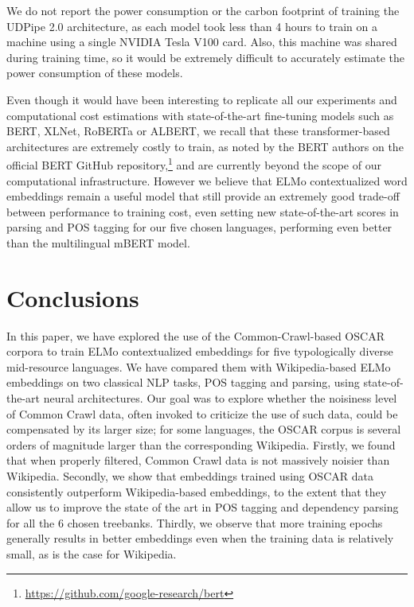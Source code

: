 We do not report the power consumption or the carbon footprint of training the UDPipe 2.0 architecture, as each model took less than 4 hours to train on a machine using a single NVIDIA Tesla V100 card. Also, this machine was shared during training time, so it would be extremely difficult to accurately estimate the power consumption of these models.

Even though it would have been interesting to replicate all our experiments and computational cost estimations with state-of-the-art fine-tuning models such as BERT, XLNet, RoBERTa or ALBERT, we recall that these transformer-based architectures are extremely costly to train, as noted by the BERT authors on the official BERT GitHub repository,\footnote{\url{https://github.com/google-research/bert}} and are currently beyond the scope of our computational infrastructure. However we believe that ELMo contextualized word embeddings remain a useful model that still provide an extremely good trade-off between performance to training cost, even setting new state-of-the-art scores in parsing and POS tagging for our five chosen languages, performing even better than the multilingual mBERT model.


\section{Conclusions}

In this paper, we have explored the use of the Common-Crawl-based OSCAR corpora to train ELMo contextualized embeddings for five typologically diverse mid-resource languages. We have compared them with Wikipedia-based ELMo embeddings on two classical NLP tasks, POS tagging and parsing, using state-of-the-art neural architectures. Our goal was to explore whether the noisiness level of Common Crawl data, often invoked to criticize the use of such data, could be compensated by its larger size; for some languages, the OSCAR corpus is several orders of magnitude larger than the corresponding Wikipedia. Firstly, we found that when properly filtered, Common Crawl data is not massively noisier than Wikipedia. Secondly, we show that embeddings trained using OSCAR data consistently outperform Wikipedia-based embeddings, to the extent that they allow us to improve the state of the art in POS tagging and dependency parsing for all the 6 chosen treebanks. Thirdly, we observe that more training epochs generally results in better embeddings even when the training data is relatively small, as is the case for Wikipedia.

